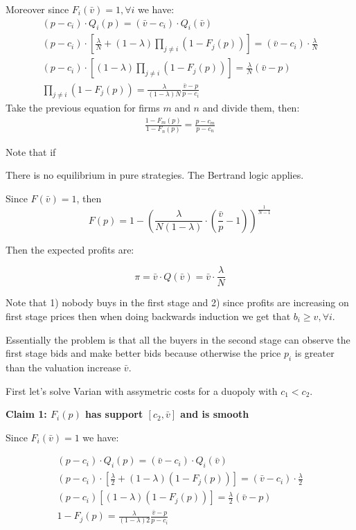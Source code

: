 \documentclass[12pt]{article}
\theoremstyle{plain}
\theoremstyle{plain}
\begin{document}
Moreover since $F_i(\bar{v}) = 1, \forall i$ we have: 
\begin{align*}
    (p - c_i) \cdot Q_i(p) = (\bar{v}-c_i) \cdot Q_i(\bar{v}) \\
     (p - c_i) \cdot \left[\frac{\lambda}{N} +  (1 - \lambda) \prod_{j\neq i} \left(1 - F_j(p)\right)\right] = (\bar{v}-c_i) \cdot \frac{\lambda}{N} \\
     (p- c_i) \cdot \left[ (1 - \lambda) \prod_{j\neq i} \left(1 - F_j(p)\right)\right] = \frac{\lambda}{N}(\bar{v}-p) \\
      \prod_{j\neq i} \left(1 - F_j(p)\right) = \frac{\lambda}{(1 - \lambda)N}\frac{\bar{v}-p}{p- c_i} 
\end{align*}
Take the previous equation for firms $m$ and $n$ and divide them, then: 
\begin{align*}
    \frac{1 - F_m(p)}{1 - F_n(p)}  = \frac{p-c_m}{p- c_n}
\end{align*}

Note that if 


\vspace{3cm}


There is no equilibrium in pure strategies. The Bertrand logic applies.




Since $F(\bar{v}) = 1$, then
\[
F(p) = 1 - \left( \frac{ \lambda}{N (1- \lambda)} \cdot \left( \frac{\bar{v}}{p} - 1 \right) \right)^{\frac{1}{N-1}}
\]

Then the expected profits are: 

\[
\pi =  \bar{v} \cdot Q(\bar{v})=  \bar{v} \cdot \frac{\lambda}{N}
\]

Note that 1) nobody buys in the first stage and 2) since profits are increasing on first stage prices then when doing backwards induction we get that $b_i \geq v, \forall i$. 

Essentially the problem is that all the buyers in the second stage can observe the first stage bids and make better bids because otherwise the price $p_i$ is greater than the valuation increase $\bar{v}$. 


\vspace{3cm}

First let's solve Varian with assymetric costs for a duopoly with $c_1 < c_2$.

\textbf{Claim 1: $F_i(p)$ has support $[c_2, \bar{v}]$ and is smooth}

Since $F_i(\bar{v}) =1$ we have: 

\begin{align*}
    (p - c_i) \cdot Q_i(p) = (\bar{v}-c_i) \cdot Q_i(\bar{v}) \\
     (p - c_i) \cdot \left[\frac{\lambda}{2} +  (1 - \lambda) (1 - F_j(p))\right] = (\bar{v}-c_i) \cdot \frac{\lambda}{2} \\
     (p- c_i)  \left[ (1 - \lambda)  (1 - F_j(p))\right] = \frac{\lambda}{2}(\bar{v}-p) \\
     1 - F_j(p) = \frac{\lambda}{(1 - \lambda)2}\frac{\bar{v}-p}{p- c_i} 
\end{align*}
\end{document}
